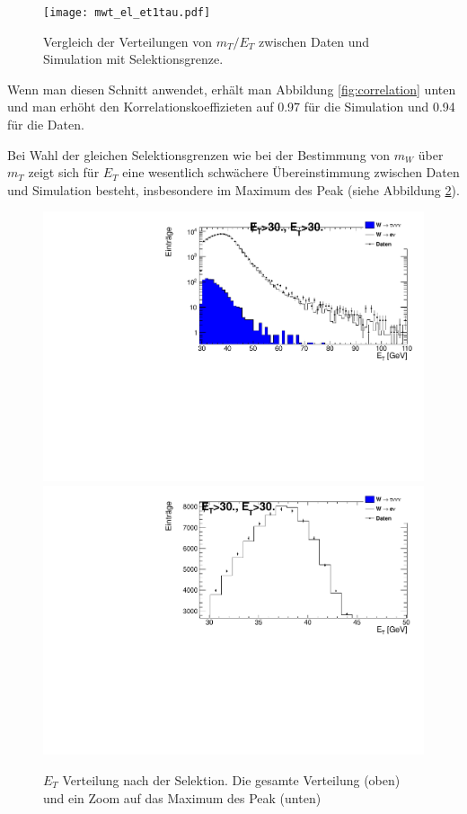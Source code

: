 \documentclass[a4paper,12pt]{article}
\newcommand{\met}{\ensuremath{\not\mathrel{E}}_T}
\begin{document}
\begin{figure}[htb]
	\centering
	\texttt{[image: mwt\_el\_et1tau.pdf]}
	\caption{Vergleich der Verteilungen von $m_T/E_T$ zwischen Daten und Simulation mit
	Selektionsgrenze.}
	\label{fig:verhaeltnis}
\end{figure}

Wenn man diesen Schnitt anwendet, erhält man Abbildung \ref{fig:correlation} unten und man
erhöht den Korrelationskoeffizieten auf 0.97 für die Simulation und 0.94 für die Daten.

Bei Wahl der gleichen Selektionsgrenzen wie bei der Bestimmung von $m_{W}$ über $m_T$ zeigt sich
für $E_{T}$ eine wesentlich schwächere Übereinstimmung zwischen Daten und Simulation besteht, insbesondere
im Maximum des Peak (siehe Abbildung \ref{fig:etaftercut}).
\begin{figure}[htb]
	\centering
	\includegraphics[width=.7\textwidth]{E_t_aftercut.pdf}
	\includegraphics[width=.7\textwidth]{E_t_aftercut_peak.pdf}
	\caption{$E_{T}$ Verteilung nach der Selektion. Die gesamte Verteilung (oben) und ein Zoom auf das Maximum des Peak (unten) }
	\label{fig:etaftercut}
\end{figure}



\end{document}

